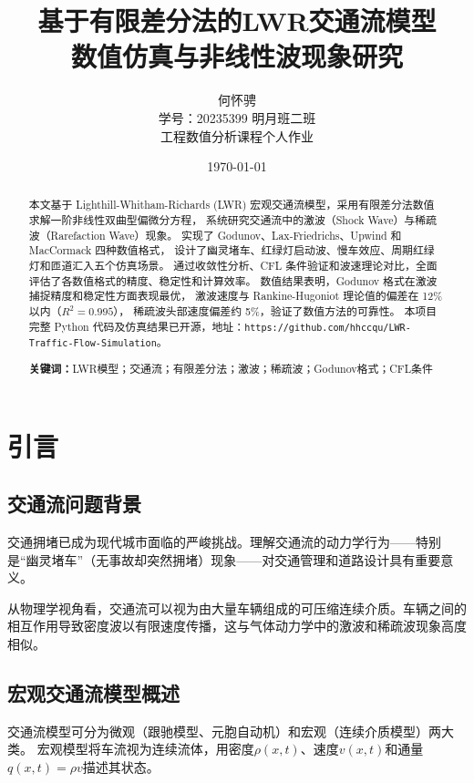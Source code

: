 \documentclass[12pt,a4paper]{ctexart}
\title{\textbf{基于有限差分法的LWR交通流模型\\数值仿真与非线性波现象研究}}
\author{
    何怀骋 \\[4pt]
    {\small 学号：20235399 \quad 明月班二班} \\[8pt]
    {\small 工程数值分析课程个人作业}
}
\date{\today}
\begin{document}
\maketitle

\begin{abstract}
本文基于 Lighthill-Whitham-Richards (LWR) 宏观交通流模型，采用有限差分法数值求解一阶非线性双曲型偏微分方程，
系统研究交通流中的激波（Shock Wave）与稀疏波（Rarefaction Wave）现象。
实现了 Godunov、Lax-Friedrichs、Upwind 和 MacCormack 四种数值格式，
设计了幽灵堵车、红绿灯启动波、慢车效应、周期红绿灯和匝道汇入五个仿真场景。
通过收敛性分析、CFL 条件验证和波速理论对比，全面评估了各数值格式的精度、稳定性和计算效率。
数值结果表明，Godunov 格式在激波捕捉精度和稳定性方面表现最优，
激波速度与 Rankine-Hugoniot 理论值的偏差在 12\% 以内（$R^2=0.995$），
稀疏波头部速度偏差约 5\%，验证了数值方法的可靠性。
本项目完整 Python 代码及仿真结果已开源，地址：\texttt{https://github.com/hhccqu/LWR-Traffic-Flow-Simulation}。

\textbf{关键词：}LWR模型；交通流；有限差分法；激波；稀疏波；Godunov格式；CFL条件
\end{abstract}

\tableofcontents
\newpage

\section{引言}

\subsection{交通流问题背景}

交通拥堵已成为现代城市面临的严峻挑战。理解交通流的动力学行为——特别是``幽灵堵车''（无事故却突然拥堵）现象——对交通管理和道路设计具有重要意义。

从物理学视角看，交通流可以视为由大量车辆组成的可压缩连续介质。车辆之间的相互作用导致密度波以有限速度传播，这与气体动力学中的激波和稀疏波现象高度相似。

\subsection{宏观交通流模型概述}

交通流模型可分为微观（跟驰模型、元胞自动机）和宏观（连续介质模型）两大类。
宏观模型将车流视为连续流体，用密度$\rho(x,t)$、速度$v(x,t)$和通量$q(x,t) = \rho v$描述其状态。
\end{document}
